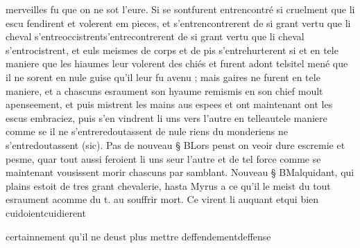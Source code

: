 \documentclass{article}
\begin{document}
\begin{pages}
                  merveilles fu que on ne sot l’eure. Si 
                  se sontfurent entrencontré si cruelment que li escu fendirent et volerent em pieces, et s’entrencontrerent de si grant vertu que li cheval 
                  s’entreoccistrents'entrecontrerent de si grant vertu que li cheval
                     s'entrocistrent, et euls meismes de corps et de pis s’entrehurterent 
                  si et en tele maniere que les hiaumes leur volerent des chiés et furent 
                  adont telsitel mené que il ne sorent 
                  en nule guise qu’il leur fu avenu ; mais gaires ne furent en tele maniere, et a chascuns 
                  esraument son hyaume 
                  remismis en son chief moult apenseement, et puis mistrent les mains aus espees et 
                  ont maintenant
                  ont les escus embraciez, 
                  puis s’en vindrent li uns vers l’autre en 
                  telleautele maniere comme se il 
                  ne s’entreredoutassent de nule riens 
                        du monderiens ne s'entredoutassent (sic). \pend
            \pstart Pas de nouveau § BLors
               peust on veoir dure escremie et pesme, quar tout aussi feroient li uns seur l’autre
               et de tel force comme se maintenant vousissent morir chascuns par samblant. Nouveau § BMalquidant,
               qui plains estoit de tres grant chevalerie, hasta Myrus a ce qu’il le meist 
                  du tout esraument acomme du t. au souffrir mort. Ce virent li auquant 
                  etqui bien 
                  cuidoientcuidierent
               
                  certainnement qu’il ne deust plus mettre 
                  deffendementdeffense
               

\end{pages}
\end{document}
